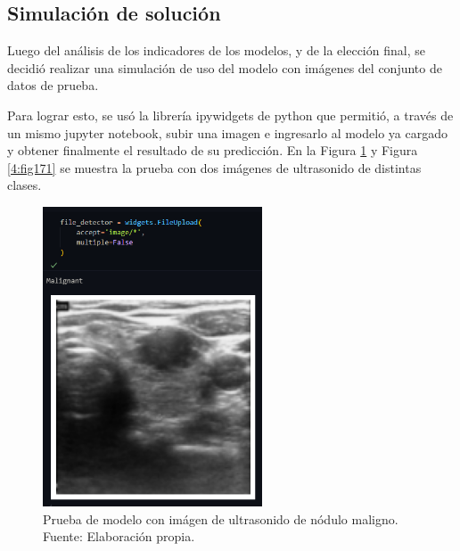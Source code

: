 \subsection{Simulación de solución}

Luego del análisis de los indicadores de los modelos, y de la elección final, se decidió realizar una simulación de uso del modelo con imágenes del conjunto de datos de prueba.

Para lograr esto, se usó la librería ipywidgets de python que permitió, a través de un mismo jupyter notebook, subir una imagen e ingresarlo al modelo ya cargado y obtener finalmente el resultado de su predicción. En la Figura \ref{4:fig170} y Figura \ref{4:fig171} se muestra la prueba con dos imágenes de ultrasonido de distintas clases.

\begin{figure}[H]
	\begin{center}
		\includegraphics[width=0.58\textwidth]{4/figures/simulacion_modelo_malign.PNG}
		\caption[Prueba de modelo con imágen de ultrasonido de nódulo maligno]{Prueba de modelo con imágen de ultrasonido de nódulo maligno. \\
		Fuente: Elaboración propia.}
		\label{4:fig170}
	\end{center}
\end{figure}

